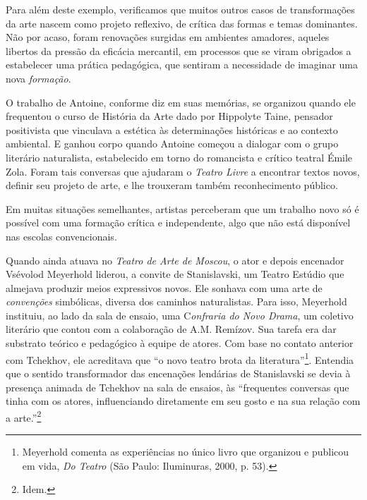 Para além deste exemplo, verificamos que muitos outros casos de
transformações da arte nascem como projeto reflexivo, de crítica das
formas e temas dominantes. Não por acaso, foram renovações surgidas em
ambientes amadores, aqueles libertos da pressão da eficácia mercantil,
em processos que se viram obrigados a estabelecer uma prática
pedagógica, que sentiram a necessidade de imaginar uma nova
\textit{formação}.

O trabalho de Antoine, conforme diz em suas memórias, se organizou
quando ele frequentou o curso de História da Arte dado por Hippolyte
Taine, pensador positivista que vinculava a estética às determinações
históricas e ao contexto ambiental. E ganhou corpo quando Antoine
começou a dialogar com o grupo literário naturalista, estabelecido em
torno do romancista e crítico teatral Émile Zola. Foram tais conversas
que ajudaram o \textit{Teatro Livre} a encontrar textos novos, definir seu
projeto de arte, e lhe trouxeram também reconhecimento público.

Em muitas situações semelhantes, artistas perceberam que um trabalho
novo só é possível com uma formação crítica e independente, algo que não
está disponível nas escolas convencionais.

Quando ainda atuava no \textit{Teatro de Arte de Moscou}, o ator e depois
encenador Vsévolod Meyerhold liderou, a convite de Stanislavski, um
Teatro Estúdio que almejava produzir meios expressivos novos. Ele
sonhava com uma arte de \textit{convenções} simbólicas, diversa dos
caminhos naturalistas. Para isso, Meyerhold instituiu, ao lado da sala
de ensaio, uma C\textit{onfraria do Novo Drama}, um coletivo literário que
contou com a colaboração de A.M. Remízov. Sua tarefa era dar substrato
teórico e pedagógico à equipe de atores. Com base no contato anterior
com Tchekhov, ele acreditava que “o novo teatro brota da
literatura”\footnote{Meyerhold comenta as experiências no único livro
  que organizou e publicou em vida, \textit{Do Teatro} (São Paulo:
  Iluminuras, 2000, p. 53).}. Entendia que o sentido transformador das
encenações lendárias de Stanislavski se devia à presença animada de
Tchekhov na sala de ensaios, às “frequentes conversas que tinha com os
atores, influenciando diretamente em seu gosto e na sua relação com a
arte.”\footnote{Idem.}

